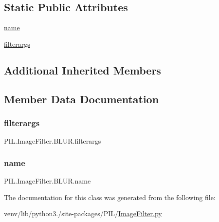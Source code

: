 \subsection*{Static Public Attributes}
\begin{DoxyCompactItemize}
\item 
\hyperlink{classPIL_1_1ImageFilter_1_1BLUR_a45c79dff3b203facfc58a715256f6ee5}{name}
\item 
\hyperlink{classPIL_1_1ImageFilter_1_1BLUR_a4b17ec21a9def9fa70406b21a4f5f5d5}{filterargs}
\end{DoxyCompactItemize}
\subsection*{Additional Inherited Members}


\subsection{Member Data Documentation}
\mbox{\label{classPIL_1_1ImageFilter_1_1BLUR_a4b17ec21a9def9fa70406b21a4f5f5d5}} 
\subsubsection{\texorpdfstring{filterargs}{filterargs}}
{\footnotesize\ttfamily P\+I\+L.\+Image\+Filter.\+B\+L\+U\+R.\+filterargs\hspace{0.3cm}{\ttfamily [static]}}

\mbox{\label{classPIL_1_1ImageFilter_1_1BLUR_a45c79dff3b203facfc58a715256f6ee5}} 
\subsubsection{\texorpdfstring{name}{name}}
{\footnotesize\ttfamily P\+I\+L.\+Image\+Filter.\+B\+L\+U\+R.\+name\hspace{0.3cm}{\ttfamily [static]}}



The documentation for this class was generated from the following file\+:\begin{DoxyCompactItemize}
\item 
venv/lib/python3./site-\/packages/\+P\+I\+L/\hyperlink{ImageFilter_8py}{Image\+Filter.\+py}\end{DoxyCompactItemize}
